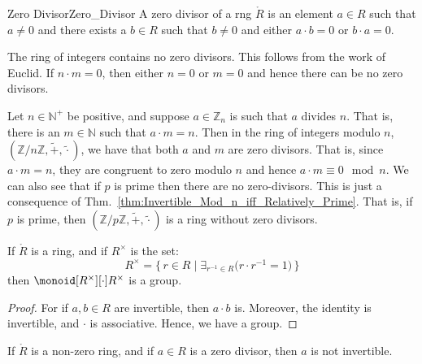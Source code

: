     \begin{fdefinition}{Zero Divisor}{Zero_Divisor}
        A zero divisor of a rng $\ring{R}$ is an element $a\in{R}$ such that
        $a\ne{0}$ and there exists a $b\in{R}$ such that $b\ne{0}$ and
        either $a\cdot{b}=0$ or $b\cdot{a}=0$.
    \end{fdefinition}
    \begin{example}
        The ring of integers contains no zero divisors. This follows from
        the work of Euclid. If $n\cdot{m}=0$, then either $n=0$ or $m=0$ and
        hence there can be no zero divisors.
    \end{example}
    \begin{example}
        Let $n\in\mathbb{N}^{+}$ be positive, and suppose
        $a\in\mathbb{Z}_{n}$ is such that $a$ divides $n$. That is, there is
        an $m\in\mathbb{N}$ such that $a\cdot{m}=n$. Then in the ring of
        integers modulo $n$,
        $(\mathbb{Z}/n\mathbb{Z},\tilde{+},\tilde{\cdot})$, we have that
        both $a$ and $m$ are zero divisors. That is, since $a\cdot{m}=n$,
        they are congruent to zero modulo $n$ and hence
        $a\cdot{m}\equiv{0}\mod{n}$. We can also see that if $p$ is prime
        then there are no zero-divisors. This is just a consequence of
        Thm.~\ref{thm:Invertible_Mod_n_iff_Relatively_Prime}. That is, if
        $p$ is prime, then
        $(\mathbb{Z}/p\mathbb{Z},\tilde{+},\tilde{\cdot})$ is a ring without
        zero divisors.
    \end{example}
    \begin{theorem}
        \label{thm:Group_of_Units_of_Ring_is_Group}%
        If $\ring{R}$ is a ring, and if $R^{\times}$ is the set:
        \begin{equation}
            R^{\times}=\big\{\,r\in{R}\;|\;
                \exists_{r^{\minus{1}}\in{R}}
                \big(r\cdot{r}^{\minus{1}}=1\big)\,\big\}
        \end{equation}
        then $\monoid[R^{\times}][\cdot]{R^{\times}}$ is a group.
    \end{theorem}
    \begin{proof}
        For if $a,b\in{R}$ are invertible, then $a\cdot{b}$ is. Moreover,
        the identity is invertible, and $\cdot$ is associative. Hence, we
        have a group.
    \end{proof}
    \begin{theorem}
        \label{thm:Ring_Zero_Divisor_Not_Invertible}%
        If $\ring{R}$ is a non-zero ring, and if $a\in{R}$ is a zero
        divisor, then $a$ is not invertible.
    \end{theorem}
